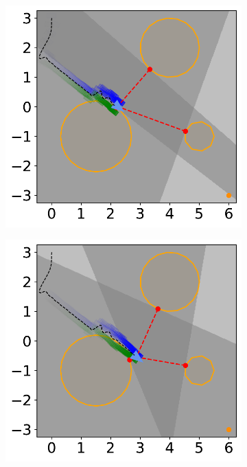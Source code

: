 \begin{figure}[H]
    \begin{subfigure}{0.35\textwidth}
        \centering
        \includegraphics[width=\textwidth]{figures/Simulations/sim1circles/frame_4.pdf}
    \end{subfigure}
    \hspace{1em}
    \begin{subfigure}{0.35\textwidth}
        \centering
        \includegraphics[width=\textwidth]{figures/Simulations/sim1circles/frame_5.pdf}
    \end{subfigure}%


\end{figure}
